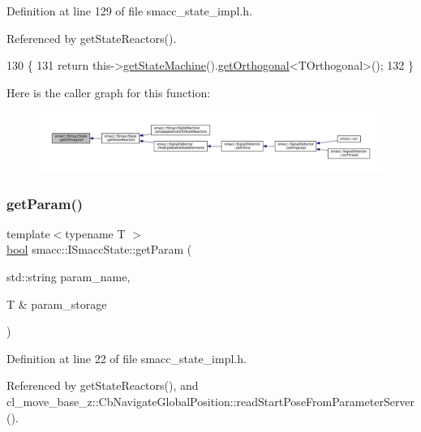 Definition at line 129 of file smacc\+\_\+state\+\_\+impl.\+h.



Referenced by get\+State\+Reactors().


\begin{DoxyCode}
130 \{
131     \textcolor{keywordflow}{return} this->\hyperlink{classsmacc_1_1ISmaccState_a562bb3f9a3ac16b8be71e4794c9e7523}{getStateMachine}().\hyperlink{classsmacc_1_1ISmaccStateMachine_a38b8b6e3d65b7de33020c9c397cf29bb}{getOrthogonal}<TOrthogonal>();
132 \}
\end{DoxyCode}
Here is the caller graph for this function\+:
\nopagebreak
\begin{figure}[H]
\begin{center}
\leavevmode
\includegraphics[width=350pt]{classsmacc_1_1ISmaccState_afc5c5683cbe39964a52fc3a2553196d2_icgraph}
\end{center}
\end{figure}
\mbox{\label{classsmacc_1_1ISmaccState_abbb3a24b912c6e8de28f7b86123b6357}} 
\subsubsection{\texorpdfstring{get\+Param()}{getParam()}}
{\footnotesize\ttfamily template$<$typename T $>$ \\
\hyperlink{classbool}{bool} smacc\+::\+I\+Smacc\+State\+::get\+Param (\begin{DoxyParamCaption}\item[{std\+::string}]{param\+\_\+name,  }\item[{T \&}]{param\+\_\+storage }\end{DoxyParamCaption})}



Definition at line 22 of file smacc\+\_\+state\+\_\+impl.\+h.



Referenced by get\+State\+Reactors(), and cl\+\_\+move\+\_\+base\+\_\+z\+::\+Cb\+Navigate\+Global\+Position\+::read\+Start\+Pose\+From\+Parameter\+Server().


